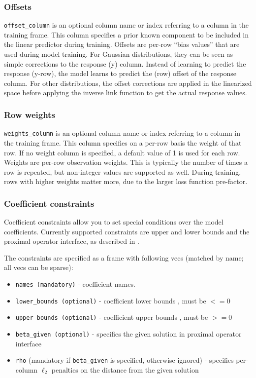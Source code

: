 \subsubsection{Offsets}

\texttt{offset\_column} is an optional column name or index referring to a column in the training frame. This column specifies a prior known component to be included in the linear predictor during training. Offsets are per-row “bias values” that are used during model training. For Gaussian distributions, they can be seen as simple corrections to the response (y) column. Instead of learning to predict the response (y-row), the model learns to predict the (row) offset of the response column. For other distributions, the offset corrections are applied in the linearized space before applying the inverse link function to get the actual response values.  

\subsubsection{Row weights}

\texttt{weights\_column} is an optional column name or index referring to a column in the training frame. This column specifies on a per-row basis the weight of that row.  If no weight column is specified, a default value of 1 is used for each row. Weights are per-row observation weights. This is typically the number of times a row is repeated, but non-integer values are supported as well. During training, rows with higher weights matter more, due to the larger loss function pre-factor.

\subsubsection{Coefficient constraints}

Coefficient constraints allow you to set special conditions over the model coefficients. Currently supported
constraints are upper and lower bounds and the proximal operator interface, as described in .

The constraints are specified as a frame with following vecs (matched by name; all vecs can be sparse):

\begin{itemize}
\item \texttt{names (mandatory)}  - coefficient names. 
\item \texttt{lower\_bounds (optional)} - coefficient lower bounds , must be $<= 0$
\item \texttt{upper\_bounds (optional)} - coefficient upper bounds , must be $>= 0$
\item \texttt{beta\_given (optional)} - specifies the given solution in proximal operator interface
\item \texttt{rho} (mandatory if \texttt{beta\_given} is specified, otherwise ignored) - specifies per-column  $\ell_2$ penalties on the distance from the given solution
\end{itemize}
 
